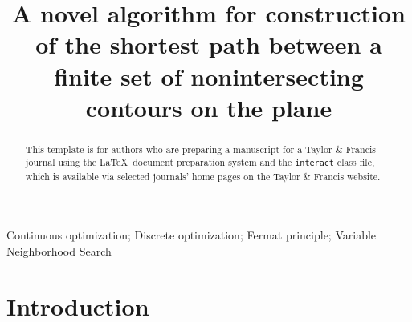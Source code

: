 \documentclass[]{interact}
\begin{document}
\title{A novel algorithm for construction of the shortest path
between a finite set of nonintersecting contours on the plane}

\author{
}

\maketitle

\begin{abstract}
  This template is for authors who are preparing a manuscript for a Taylor \& Francis journal using the \LaTeX\ document preparation system and the \texttt{interact} class file, which is available via selected journals' home pages on the Taylor \& Francis website.
\end{abstract}

\begin{keywords}
  Continuous optimization;
  Discrete optimization;
  Fermat principle;
  Variable Neighborhood Search
\end{keywords}

\section{Introduction}
\end{document}
